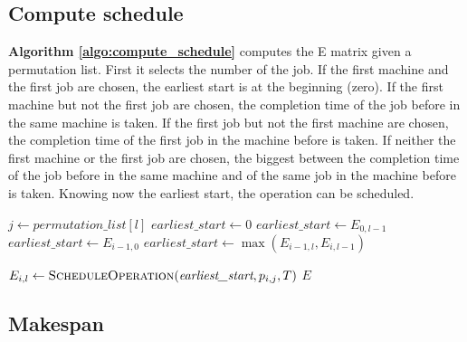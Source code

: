 \subsection{Compute schedule}

\textbf{Algorithm \ref{algo:compute_schedule}} computes the E matrix given a permutation list. First it selects the number of the job. If the first machine and the first job are chosen, the earliest start is at the beginning (zero). If the first machine but not the first job are chosen, the completion time of the job before in the same machine is taken. If the first job but not the first machine are chosen, the completion time of the first job in the machine before is taken. If neither the first machine or the first job are chosen, the biggest between the completion time of the job before in the same machine and of the same job in the machine before is taken. Knowing now the earliest start, the operation can be scheduled.

\begin{algorithm}[H]
\caption{Compute schedule}
\label{algo:compute_schedule}
\begin{algorithmic}[1]

    \Statex
        \Statex
                \Statex
                \State $j \gets \textit{permutation\_list}[l]$
                \Statex
                    \State $\textit{earliest\_start} \gets 0$
                    \State $\textit{earliest\_start} \gets E_{0,l-1}$
                    \State $\textit{earliest\_start} \gets E_{i-1,0}$
                \Else
                    \State $\textit{earliest\_start} \gets \max(E_{i-1,l}, E_{i,l-1})$
                \EndIf
                \Statex

                \State $E_{i,l} \gets \text{\textsc{ScheduleOperation}}(\textit{earliest\_start}, p_{i,j}, T)$
            \EndFor
        \EndFor
        \Statex
        \State \Return $E$
    \EndFunction

\end{algorithmic}
\end{algorithm}

\subsection{Makespan}

